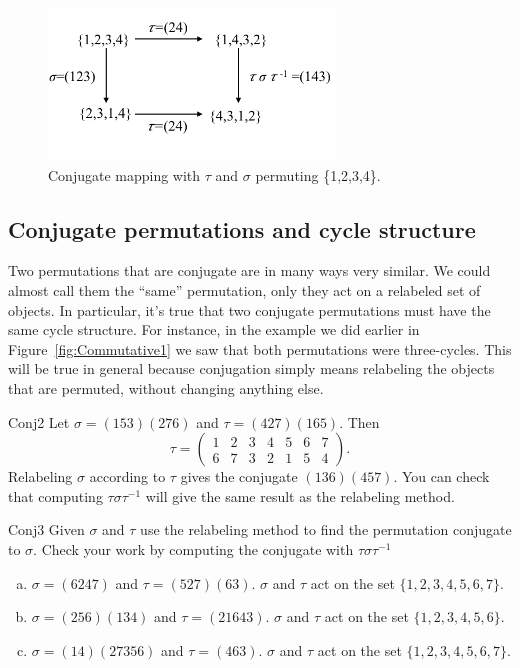 \begin{figure}[ht]
\begin{center}
\includegraphics[width=3in]{images/Commutative2.png}
\caption{Conjugate mapping with $\tau$ and $\sigma$ permuting \{1,2,3,4\}.}\label{fig:Commutative2}
\end{center}
\end{figure}

\subsection *{Conjugate permutations and cycle structure}

Two permutations that are conjugate are in many ways very similar. We could almost call them the ``same'' permutation, only they act on a relabeled set of objects. In particular, it's true that two conjugate permutations must have the same cycle structure. For instance, in the example we did earlier in Figure~\ref{fig:Commutative1} we saw that both permutations were three-cycles.  This will be true in general because conjugation simply means relabeling the objects that are permuted, without changing anything else.

\begin{example}{Conj2}
Let $\sigma = (153)(276)$ and $\tau = (427)(165)$. Then
$$\tau=\begin{pmatrix} 1&2&3&4&5&6&7\\6&7&3&2&1&5&4  \end{pmatrix}.$$ 
Relabeling $\sigma$ according to $\tau$ gives the conjugate $(136)(457)$. You can check that computing $ \tau \sigma \tau^{-1}$ will give the same result as the relabeling method.
\end{example}
\begin{exercise}{Conj3}
Given $\sigma$ and $\tau$ use the relabeling method to find the permutation conjugate to $\sigma$.  Check your work by computing the conjugate with $\tau\sigma\tau^{-1}$
\begin{enumerate}[(a)]
\item $\sigma=(6247)$ and $\tau=(527)(63)$.  $\sigma$ and $\tau$ act on the set $\{1,2,3,4,5,6,7\}$.
\item$\sigma=(256)(134)$ and $\tau=(21643)$.  $\sigma$ and $\tau$ act on the set $\{1,2,3,4,5,6\}$.
\item$\sigma=(14)(27356)$ and $\tau=(463)$.  $\sigma$ and $\tau$ act on the set $\{1,2,3,4,5,6,7\}$.
\end{enumerate}
\end{exercise}

